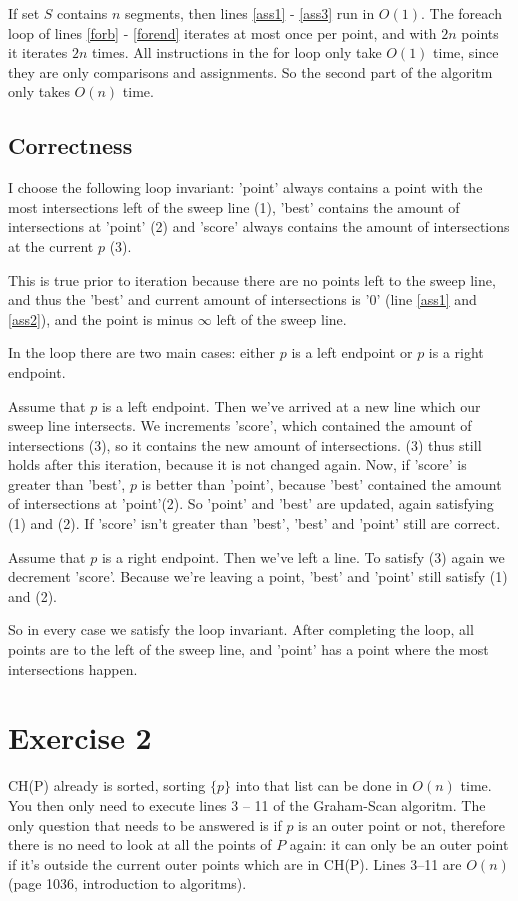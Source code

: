 \documentclass{article}
\begin{document}
If set $S$ contains $n$ segments, then lines \ref{ass1} - \ref{ass3} run in
$O(1)$. The foreach loop of lines \ref{forb} - \ref{forend} iterates at most
once per point, and with $2n$ points it iterates $2n$ times. All instructions
in the for loop only take $O(1)$ time, since they are only comparisons and
assignments. So the second part of the algoritm only takes $O(n)$ time.

\subsection{Correctness}

I choose the following loop invariant: 'point' always contains a point with
the most intersections left of the sweep line (1), 'best' contains the amount
of intersections at 'point' (2) and 'score' always contains the amount of
intersections at the current $p$ (3).

This is true prior to iteration because there are no points left to the sweep
line, and thus the 'best' and current amount of intersections is '0' (line
\ref{ass1} and \ref{ass2}), and the point is minus $\infty$ left of the sweep
line. 

In the loop there are two main cases: either $p$ is a left endpoint or $p$ is
a right endpoint.

Assume that $p$ is a left endpoint. Then we've arrived at a new line which our
sweep line intersects. We increments 'score', which contained the amount of
intersections (3), so it contains the new amount of intersections. (3) thus
still holds after this iteration, because it is not changed again. Now, if
'score' is greater than 'best', $p$ is better than 'point', because 'best' 
contained the amount of intersections at 'point'(2). So 'point' and
'best' are updated, again satisfying (1) and (2). If 'score' isn't greater than
'best', 'best' and 'point' still are correct.

Assume that $p$ is a right endpoint. Then we've left a line. To satisfy (3)
again we decrement 'score'. Because we're leaving a point, 'best' and 'point'
still satisfy (1) and (2).

So in every case we satisfy the loop invariant. After completing the loop, 
all points are to the left of the sweep line, and 'point' has a point where
the most intersections happen.

\section{Exercise 2}

CH(P) already is sorted, sorting $\{p\}$ into that list can be done in $O(n)$
time. You then only need to execute lines 3 -- 11 of the Graham-Scan algoritm.
The only question that needs to be answered is if $p$ is an outer point or not,
therefore there is no need to look at all the points of $P$ again: it can only
be an outer point if it's outside the current outer points which are in CH(P).
Lines 3--11 are $O(n)$ (page 1036, introduction to algoritms).
\end{document}
